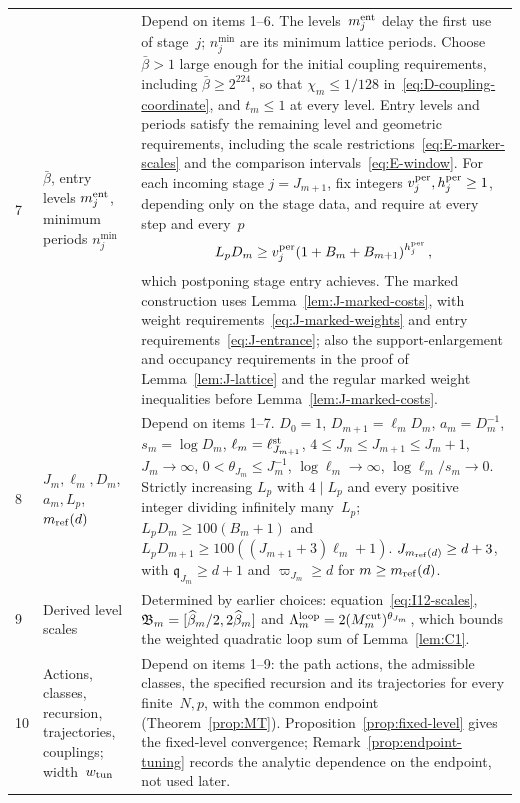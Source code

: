 \begin{longtable}{@{}p{}p{}p{}@{}}
7 & \raggedright $\bar\beta$, entry levels $m_j^{\rm ent}$, minimum periods $n_j^{\min}$ & Depend on items 1--6. The levels~$m_j^{\rm ent}$ delay the first use of stage~$j$; $n_j^{\min}$ are its minimum lattice periods. Choose $\bar\beta>1$ large enough for the initial coupling requirements, including $\bar\beta\ge2^{224}$, so that $\chi_m\le1/128$ in~\eqref{eq:D-coupling-coordinate}, and $t_m\le1$ at every level. Entry levels and periods satisfy the remaining level and geometric requirements, including the scale restrictions~\eqref{eq:E-marker-scales} and the comparison intervals~\eqref{eq:E-window}. For each incoming stage $j=J_{m+1}$, fix integers $v_j^{\rm per},h_j^{\rm per}\ge1$, depending only on the stage data, and require at every step and every~$p$
\begin{equation*}
L_pD_m\ge v_j^{\rm per}(1+B_m+B_{m+1})^{h_j^{\rm per}}\,,
\end{equation*}
which postponing stage entry achieves. The marked construction uses Lemma~\ref{lem:J-marked-costs}, with weight requirements~\eqref{eq:J-marked-weights} and entry requirements~\eqref{eq:J-entrance}; also the support-enlargement and occupancy requirements in the proof of Lemma~\ref{lem:J-lattice} and the regular marked weight inequalities before Lemma~\ref{lem:J-marked-costs}.\\[3pt]
8 & \raggedright $J_m,\ell_m,D_m$, $a_m,L_p$, $m_{\mathrm{ref}}(d)$ & Depend on items 1--7. $D_0=1$, $D_{m+1}=\ell_mD_m$, $a_m=D_m^{-1}$, $s_m=\log D_m$, $\ell_m=\ell^{\rm st}_{J_{m+1}}$, $4\le J_m\le J_{m+1}\le J_m+1$, $J_m\to\infty$, $0<\theta_{J_m}\le J_m^{-1}$, $\log\ell_m\to\infty$, $\log\ell_m/s_m\to0$. Strictly increasing $L_p$ with $4\mid L_p$ and every positive integer dividing infinitely many~$L_p$; $L_pD_m\ge100(B_m+1)$ and $L_pD_{m+1}\ge100((J_{m+1}+3)\ell_m+1)$. $J_{m_{\mathrm{ref}}(d)}\ge d+3$, with $\mathfrak q_{J_m}\ge d+1$ and $\varpi_{J_m}\ge d$ for $m\ge m_{\mathrm{ref}}(d)$.\\[3pt]
9 & \raggedright Derived level scales & Determined by earlier choices: equation~\eqref{eq:I12-scales}, $\mathfrak B_m=[\widehat{\beta}_m/2,2\widehat{\beta}_m]$ and $\Lambda_m^{\rm loop}=2(M^{\mathrm{cut}}_m)^{\theta_{J_m}}$, which bounds the weighted quadratic loop sum of Lemma~\ref{lem:C1}.\\[3pt]
10 & \raggedright Actions, classes, recursion, trajectories, couplings; width~$w_{\rm tun}$ & Depend on items 1--9: the path actions, the admissible classes, the specified recursion and its trajectories for every finite~$N,p$, with the common endpoint (Theorem~\ref{prop:MT}). Proposition~\ref{prop:fixed-level} gives the fixed-level convergence; Remark~\ref{prop:endpoint-tuning} records the analytic dependence on the endpoint, not used later.\\[3pt]

\end{longtable}
